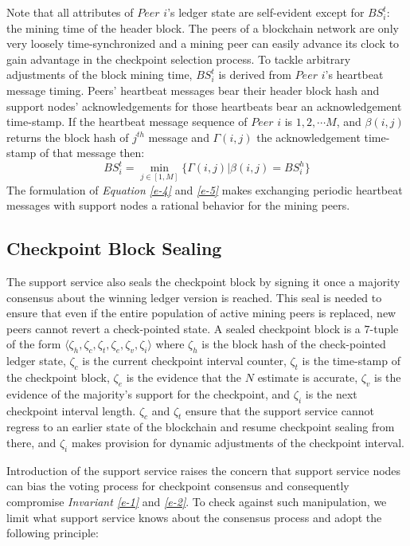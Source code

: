Note that all attributes of $Peer$ $i$'s ledger state are self-evident except for $BS_i^t$: the mining time of the header block. The peers of a blockchain network are only very loosely time-synchronized \cite{Turek:1992:MFC:136541.136542} and a mining peer can easily advance its clock to gain advantage in the checkpoint selection process. To tackle arbitrary adjustments of the block mining time, $BS_i^t$ is derived from $Peer$ $i$'s heartbeat message timing. Peers' heartbeat messages bear their header block hash and support nodes' acknowledgements for those heartbeats bear an acknowledgement time-stamp. If the heartbeat message sequence of $Peer$ $i$ is $1, 2, \cdots M$, and $\beta(i,j)$ returns the block hash of $j^{th}$ message and $\Gamma(i, j)$ the acknowledgement time-stamp of that message then:
\begin{equation}
\label{e-5}
BS_i^t = \min_{j \in \left[ 1, M \right]}\{\Gamma(i, j) | \beta(i,j) = BS_i^h \}
\end{equation}
The formulation of \textit{Equation \ref{e-4}} and \textit{\ref{e-5}} makes exchanging periodic heartbeat messages with support nodes a rational behavior for the mining peers.

\subsection{Checkpoint Block Sealing}
The support service also seals the checkpoint block by signing it once a majority consensus about the winning ledger version is reached. This seal is needed to ensure that even if the entire population of active mining peers is replaced, new peers cannot revert a check-pointed state. A sealed checkpoint block is a $7$-tuple of the form $\langle \zeta_h, \zeta_c, \zeta_t, \zeta_e, \zeta_v, \zeta_i \rangle$  where $\zeta_h$ is the block hash of the check-pointed ledger state, $\zeta_c$ is the current checkpoint interval counter, $\zeta_t$ is the time-stamp of the checkpoint block, $\zeta_e$ is the evidence that the $N$ estimate is accurate, $\zeta_v$ is the evidence of the majority's support for the checkpoint, and $\zeta_i$ is the next checkpoint interval length. $\zeta_c$ and $\zeta_t$ ensure that the support service cannot regress to an earlier state of the blockchain and resume checkpoint sealing from there, and $\zeta_i$ makes provision for dynamic adjustments of the checkpoint interval.

Introduction of the support service raises the concern that support service nodes can bias the voting process for checkpoint consensus and consequently compromise \textit{Invariant \ref{e-1}} and \textit{\ref{e-2}}. To check against such manipulation, we limit what support service knows about the consensus process and adopt the following principle:

